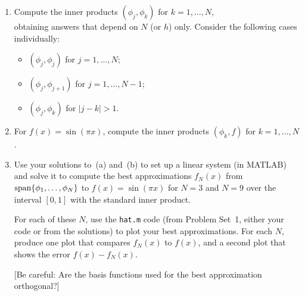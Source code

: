 \begin{enumerate}
\item Compute the inner products $(\phi_j, \phi_k)$ for $k=1,\ldots, N$,\\
obtaining answers that depend on $N$ (or $h$) only.
Consider the following cases individually:
\begin{itemize}
\item $(\phi_j, \phi_j)$ for $j=1,\ldots, N$;
\item $(\phi_j, \phi_{j+1})$ for $j=1, \ldots, N-1$;
\item $(\phi_j, \phi_k)$ for $|j-k| > 1$.
\end{itemize}

%
\item For $f(x) = \sin(\pi x)$, 
      compute the inner products $(\phi_k, f)$ for $k=1,\ldots, N$.


\item Use your solutions to~(a) and~(b) to set up a linear system (in MATLAB)
      and solve it to compute the best 
      approximations $f_N(x)$ from ${\rm span}\{\phi_1, \ldots, \phi_N\}$ to 
      $f(x) = \sin(\pi x)$ for $N=3$ and $N=9$ over the interval $[0,1]$
      with the standard inner product.  

      For each of these $N$, use the \verb|hat.m| code (from Problem Set~1, 
      either your code or from the solutions) to plot your best approximations.
      For each $N$, produce one plot that compares $f_N(x)$ to $f(x)$,
      and a second plot that shows the error $f(x) - f_N(x)$.

      [Be careful: Are the basis functions used for the best approximation orthogonal?]
\end{enumerate}


